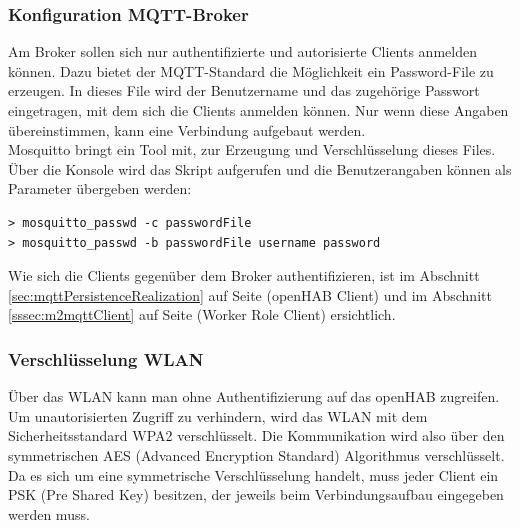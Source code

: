 \subsubsection{Konfiguration MQTT-Broker}
Am Broker sollen sich nur authentifizierte und autorisierte Clients anmelden können. Dazu bietet der MQTT-Standard die Möglichkeit ein Password-File zu erzeugen. In dieses File wird der Benutzername und das zugehörige Passwort eingetragen, mit dem sich die Clients anmelden können. Nur wenn diese Angaben übereinstimmen, kann eine Verbindung aufgebaut werden. \\
Mosquitto bringt ein Tool mit, zur Erzeugung und Verschlüsselung dieses Files. Über die Konsole wird das Skript aufgerufen und die Benutzerangaben können als Parameter übergeben werden:
\begin{lstlisting}[style=csharp, caption=mosquitto\_passwd.exe - generate password-file]
> mosquitto_passwd -c passwordFile
> mosquitto_passwd -b passwordFile username password
\end{lstlisting}
Wie sich die Clients gegenüber dem Broker authentifizieren, ist im Abschnitt \ref{sec:mqttPersistenceRealization} auf Seite \pageref{sec:mqttPersistenceRealization} (openHAB Client) und im Abschnitt \ref{sssec:m2mqttClient} auf Seite \pageref{sssec:m2mqttClient} (Worker Role Client) ersichtlich.

\subsubsection{Verschlüsselung WLAN}
Über das WLAN kann man ohne Authentifizierung auf das openHAB zugreifen. Um unautorisierten Zugriff zu verhindern, wird das WLAN mit dem Sicherheitsstandard WPA2 verschlüsselt. Die Kommunikation wird also über den symmetrischen AES (Advanced Encryption Standard) Algorithmus verschlüsselt. Da es sich um eine symmetrische Verschlüsselung handelt, muss jeder Client ein PSK (Pre Shared Key) besitzen, der jeweils beim Verbindungsaufbau eingegeben werden muss.

